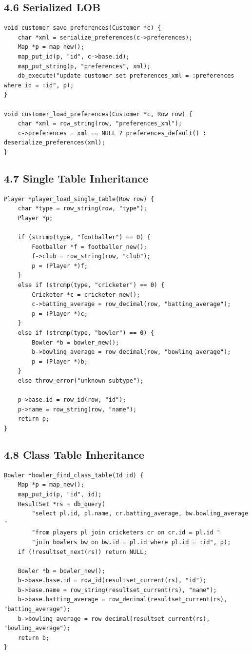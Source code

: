 \documentclass[11pt]{article}
\begin{document}
\subsection{4.6 Serialized LOB}\label{serialized-lob}

\begin{verbatim}
void customer_save_preferences(Customer *c) {
    char *xml = serialize_preferences(c->preferences);
    Map *p = map_new();
    map_put_id(p, "id", c->base.id);
    map_put_string(p, "preferences", xml);
    db_execute("update customer set preferences_xml = :preferences where id = :id", p);
}

void customer_load_preferences(Customer *c, Row row) {
    char *xml = row_string(row, "preferences_xml");
    c->preferences = xml == NULL ? preferences_default() : deserialize_preferences(xml);
}
\end{verbatim}

\subsection{4.7 Single Table
Inheritance}\label{single-table-inheritance}

\begin{verbatim}
Player *player_load_single_table(Row row) {
    char *type = row_string(row, "type");
    Player *p;

    if (strcmp(type, "footballer") == 0) {
        Footballer *f = footballer_new();
        f->club = row_string(row, "club");
        p = (Player *)f;
    }
    else if (strcmp(type, "cricketer") == 0) {
        Cricketer *c = cricketer_new();
        c->batting_average = row_decimal(row, "batting_average");
        p = (Player *)c;
    }
    else if (strcmp(type, "bowler") == 0) {
        Bowler *b = bowler_new();
        b->bowling_average = row_decimal(row, "bowling_average");
        p = (Player *)b;
    }
    else throw_error("unknown subtype");

    p->base.id = row_id(row, "id");
    p->name = row_string(row, "name");
    return p;
}
\end{verbatim}

\subsection{4.8 Class Table Inheritance}\label{class-table-inheritance}

\begin{verbatim}
Bowler *bowler_find_class_table(Id id) {
    Map *p = map_new();
    map_put_id(p, "id", id);
    ResultSet *rs = db_query(
        "select pl.id, pl.name, cr.batting_average, bw.bowling_average "
        "from players pl join cricketers cr on cr.id = pl.id "
        "join bowlers bw on bw.id = pl.id where pl.id = :id", p);
    if (!resultset_next(rs)) return NULL;

    Bowler *b = bowler_new();
    b->base.base.id = row_id(resultset_current(rs), "id");
    b->base.name = row_string(resultset_current(rs), "name");
    b->base.batting_average = row_decimal(resultset_current(rs), "batting_average");
    b->bowling_average = row_decimal(resultset_current(rs), "bowling_average");
    return b;
}
\end{verbatim}
\end{document}
